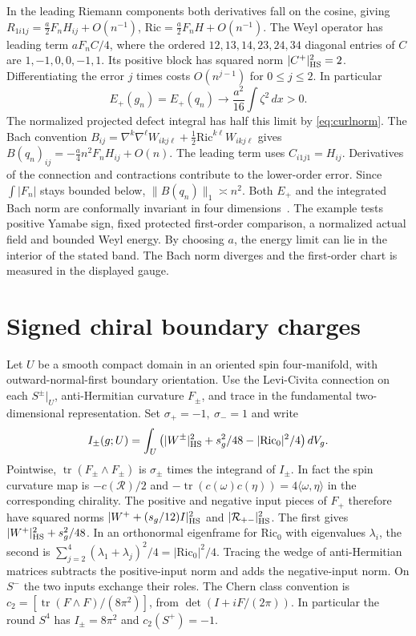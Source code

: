\documentclass[11pt]{article}
\theoremstyle{remark}
\newcommand{\Ric}{\mathrm{Ric}}
\newcommand{\ip}[2]{\langle #1,#2\rangle}
\newcommand{\Tr}{\operatorname{tr}}
\begin{document}
In the leading Riemann components both derivatives fall on the cosine, giving \(R_{1i1j}=\tfrac a2 F_n H_{ij}+O(n^{-1})\), \(\Ric=\tfrac a2 F_n H+O(n^{-1})\). The Weyl operator has leading term \(a F_n C/4\), where the ordered \(12,13,14,23,24,34\) diagonal entries of \(C\) are \(1,-1,0,0,-1,1\). Its positive block has squared norm \(|C^+|_{\rm HS}^2=2\). Differentiating the error \(j\) times costs \(O(n^{j-1})\) for \(0\le j\le2\). In particular
\[
 E_+(g_n)=E_+(q_n)\longrightarrow\frac{a^2}{16}\int\zeta^2\,dx>0 .
\]
The normalized projected defect integral has half this limit by \eqref{eq:curlnorm}. The Bach convention
\(B_{ij}=\nabla^k\nabla^\ell W_{ikj\ell}+\tfrac12\Ric^{k\ell}W_{ikj\ell}\)
gives \(B(q_n)_{ij}=-\tfrac a4 n^2 F_n H_{ij}+O(n)\). The leading term uses \(C_{i1j1}=H_{ij}\). Derivatives of the connection and contractions contribute to the lower-order error. Since \(\int|F_n|\) stays bounded below, \(\|B(q_n)\|_1\asymp n^2\). Both \(E_+\) and the integrated Bach norm are conformally invariant in four dimensions~\cite[\S2]{Derdzinski1983SelfDual,CatinoMastroliaMonticelliRigoliIntegrability}. The example tests positive Yamabe sign, fixed protected first-order comparison, a normalized actual field and bounded Weyl energy. By choosing \(a\), the energy limit can lie in the interior of the stated band. The Bach norm diverges and the first-order chart is measured in the displayed gauge.

\section{Signed chiral boundary charges}

Let \(U\) be a smooth compact domain in an oriented spin four-manifold, with outward-normal-first boundary orientation. Use the Levi-Civita connection on each \(S^\pm|_U\), anti-Hermitian curvature \(F_\pm\), and trace in the fundamental two-dimensional representation. Set \(\sigma_+=-1,\ \sigma_-=1\) and write
\[
 I_\pm(g;U)=\int_U\left(|W^\pm|_{\rm HS}^2+s_g^2/48-|\Ric_0|^2/4\right)dV_g .
\]
Pointwise, \(\Tr(F_\pm\wedge F_\pm)\) is \(\sigma_\pm\) times the integrand of \(I_\pm\). In fact the spin curvature map is \(-c(\mathcal R)/2\) and \(-\Tr(c(\omega)c(\eta))=4\ip{\omega}{\eta}\) in the corresponding chirality. The positive and negative input pieces of \(F_+\) therefore have squared norms \(|W^++(s_g/12)I|_{\rm HS}^2\) and \(|\mathcal R_{+-}|_{\rm HS}^2\). The first gives \(|W^+|_{\rm HS}^2+s_g^2/48\). In an orthonormal eigenframe for \(\Ric_0\) with eigenvalues \(\lambda_i\), the second is \(\sum_{j=2}^4(\lambda_1+\lambda_j)^2/4=|\Ric_0|^2/4\). Tracing the wedge of anti-Hermitian matrices subtracts the positive-input norm and adds the negative-input norm. On \(S^-\) the two inputs exchange their roles. The Chern class convention is \(c_2=[\Tr(F\wedge F)/(8\pi^2)]\), from \(\det(I+iF/(2\pi))\). In particular the round \(S^4\) has \(I_\pm=8\pi^2\) and \(c_2(S^+)=-1\).
\end{document}
